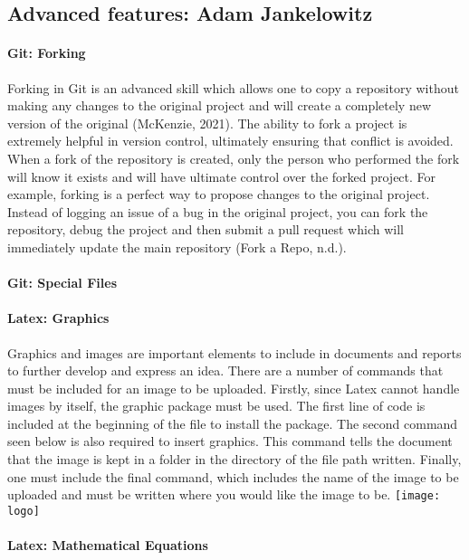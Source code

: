 \documentclass[a4paper, 11pt]{report}
\begin{document}
	\subsection{Advanced features: Adam Jankelowitz}
    \paragraph{Git: Forking} Forking in Git is an advanced skill which allows one to copy a repository without making any changes to the original project and will create a completely new version of the original (McKenzie, 2021). The ability to fork a project is extremely helpful in version control, ultimately ensuring that conflict is avoided. When a fork of the repository is created, only the person who performed the fork will know it exists and will have ultimate control over the forked project. For example, forking is a perfect way to propose changes to the original project. Instead of logging an issue of a bug in the original project, you can fork the repository, debug the project and then submit a pull request which will immediately update the main repository (Fork a Repo, n.d.). 
    
    
    \paragraph{Git: Special Files}
    
    
    \paragraph{Latex: Graphics} Graphics and images are important elements to include in documents and reports to further develop and express an idea. There are a number of commands that must be included for an image to be uploaded. Firstly, since Latex cannot handle images by itself, the graphic package must be used. The first line of code is included at the beginning of the file to install the package. The second command seen below is also required to insert graphics. This command tells the document that the image is kept in a folder in the directory of the file path written. Finally, one must include the final command, which includes the name of the image to be uploaded and must be written where you would like the image to be.
    \texttt{[image: logo]}
    
    \paragraph{Latex: Mathematical Equations}
\end{document}
